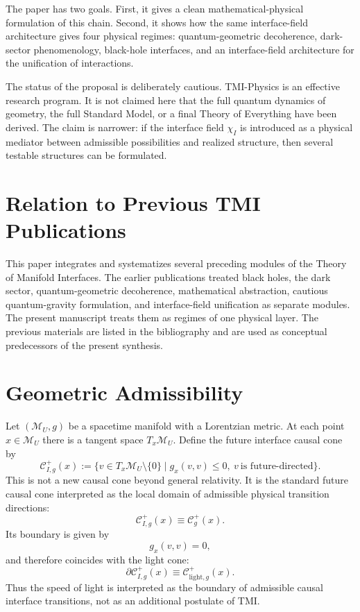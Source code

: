 \documentclass[12pt,a4paper]{article}
\newcommand{\M}{\mathcal M_U}
\begin{document}
The paper has two goals. First, it gives a clean mathematical-physical formulation of this chain. Second, it shows how the same interface-field architecture gives four physical regimes: quantum-geometric decoherence, dark-sector phenomenology, black-hole interfaces, and an interface-field architecture for the unification of interactions.

The status of the proposal is deliberately cautious. TMI-Physics is an effective research program. It is not claimed here that the full quantum dynamics of geometry, the full Standard Model, or a final Theory of Everything have been derived. The claim is narrower: if the interface field $\chi_I$ is introduced as a physical mediator between admissible possibilities and realized structure, then several testable structures can be formulated.

\section{Relation to Previous TMI Publications}
This paper integrates and systematizes several preceding modules of the Theory of Manifold Interfaces. The earlier publications treated black holes, the dark sector, quantum-geometric decoherence, mathematical abstraction, cautious quantum-gravity formulation, and interface-field unification as separate modules. The present manuscript treats them as regimes of one physical layer. The previous materials are listed in the bibliography and are used as conceptual predecessors of the present synthesis.

\section{Geometric Admissibility}
Let $(\M,g)$ be a spacetime manifold with a Lorentzian metric. At each point $x\in\M$ there is a tangent space $T_x\M$. Define the future interface causal cone by
\[
\boxed{
\mathcal C^{+}_{I,g}(x):=
\{v\in T_x\M\setminus\{0\}\mid g_x(v,v)\leq0,\ v\ \text{is future-directed}\}.
}
\]
This is not a new causal cone beyond general relativity. It is the standard future causal cone interpreted as the local domain of admissible physical transition directions:
\[
\mathcal C^{+}_{I,g}(x)\equiv \mathcal C^{+}_{g}(x).
\]
Its boundary is given by
\[
g_x(v,v)=0,
\]
and therefore coincides with the light cone:
\[
\boxed{\partial\mathcal C^{+}_{I,g}(x)\equiv \mathcal C^{+}_{\mathrm{light},g}(x).}
\]
Thus the speed of light is interpreted as the boundary of admissible causal interface transitions, not as an additional postulate of TMI.
\end{document}
